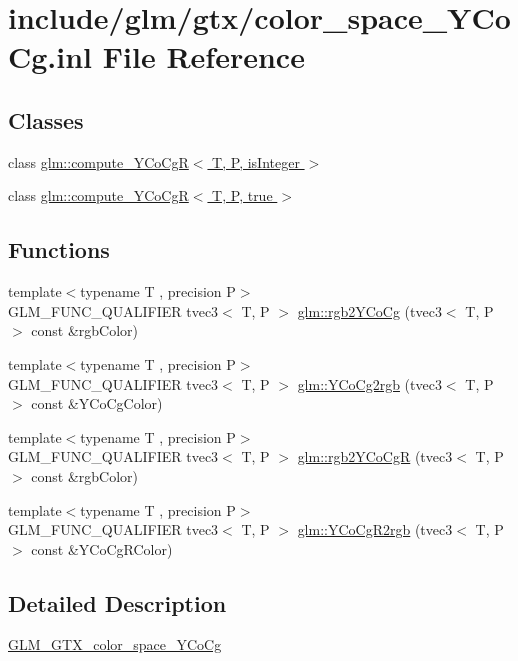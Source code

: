\hypertarget{color__space__YCoCg_8inl}{}\section{include/glm/gtx/color\+\_\+space\+\_\+\+Y\+Co\+Cg.inl File Reference}
\label{color__space__YCoCg_8inl}
\subsection*{Classes}
\begin{DoxyCompactItemize}
\item 
class \hyperlink{classglm_1_1compute__YCoCgR}{glm\+::compute\+\_\+\+Y\+Co\+Cg\+R$<$ T, P, is\+Integer $>$}
\item 
class \hyperlink{classglm_1_1compute__YCoCgR_3_01T_00_01P_00_01true_01_4}{glm\+::compute\+\_\+\+Y\+Co\+Cg\+R$<$ T, P, true $>$}
\end{DoxyCompactItemize}
\subsection*{Functions}
\begin{DoxyCompactItemize}
\item 
{\footnotesize template$<$typename T , precision P$>$ }\\G\+L\+M\+\_\+\+F\+U\+N\+C\+\_\+\+Q\+U\+A\+L\+I\+F\+I\+ER tvec3$<$ T, P $>$ \hyperlink{group__gtx__color__space__YCoCg_ga19481f6947c5b5482debd41e71b8c941}{glm\+::rgb2\+Y\+Co\+Cg} (tvec3$<$ T, P $>$ const \&rgb\+Color)
\item 
{\footnotesize template$<$typename T , precision P$>$ }\\G\+L\+M\+\_\+\+F\+U\+N\+C\+\_\+\+Q\+U\+A\+L\+I\+F\+I\+ER tvec3$<$ T, P $>$ \hyperlink{group__gtx__color__space__YCoCg_ga6d7e988a79b299ca1fa59f537e13800b}{glm\+::\+Y\+Co\+Cg2rgb} (tvec3$<$ T, P $>$ const \&Y\+Co\+Cg\+Color)
\item 
{\footnotesize template$<$typename T , precision P$>$ }\\G\+L\+M\+\_\+\+F\+U\+N\+C\+\_\+\+Q\+U\+A\+L\+I\+F\+I\+ER tvec3$<$ T, P $>$ \hyperlink{group__gtx__color__space__YCoCg_ga2e534594cc8ad252d23b14fb363ae9e2}{glm\+::rgb2\+Y\+Co\+CgR} (tvec3$<$ T, P $>$ const \&rgb\+Color)
\item 
{\footnotesize template$<$typename T , precision P$>$ }\\G\+L\+M\+\_\+\+F\+U\+N\+C\+\_\+\+Q\+U\+A\+L\+I\+F\+I\+ER tvec3$<$ T, P $>$ \hyperlink{group__gtx__color__space__YCoCg_ga4bac5462c00df0ae89242ecdbbe5dbad}{glm\+::\+Y\+Co\+Cg\+R2rgb} (tvec3$<$ T, P $>$ const \&Y\+Co\+Cg\+R\+Color)
\end{DoxyCompactItemize}


\subsection{Detailed Description}
\hyperlink{group__gtx__color__space__YCoCg}{G\+L\+M\+\_\+\+G\+T\+X\+\_\+color\+\_\+space\+\_\+\+Y\+Co\+Cg} 